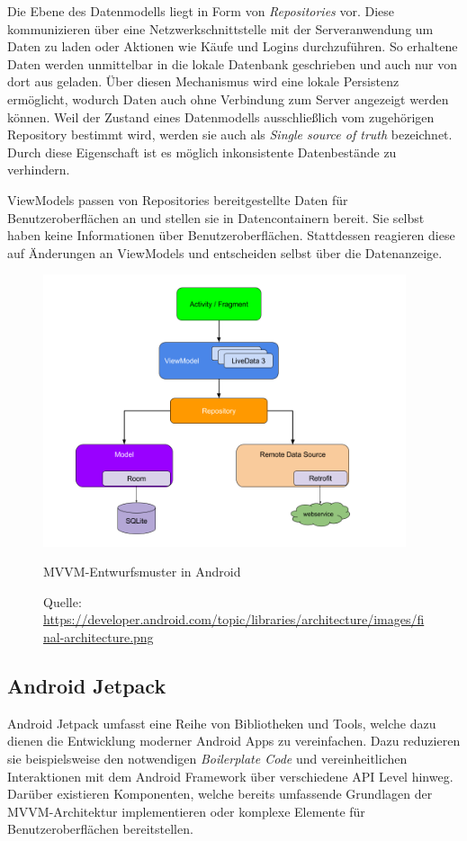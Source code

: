 \documentclass[a4paper, 11pt]{article}
\begin{document}
Die Ebene des Datenmodells liegt in Form von \textit{Repositories} vor.
Diese kommunizieren über eine Netzwerkschnittstelle mit der Serveranwendung um Daten zu laden oder Aktionen wie Käufe und Logins durchzuführen.
So erhaltene Daten werden unmittelbar in die lokale Datenbank geschrieben und auch nur von dort aus geladen.
Über diesen Mechanismus wird eine lokale Persistenz ermöglicht, wodurch Daten auch ohne Verbindung zum Server angezeigt werden können.
Weil der Zustand eines Datenmodells ausschließlich vom zugehörigen Repository bestimmt wird, werden sie auch als \textit{Single source of truth} bezeichnet.
Durch diese Eigenschaft ist es möglich inkonsistente Datenbestände zu verhindern.

ViewModels passen von Repositories bereitgestellte Daten für Benutzeroberflächen an und stellen sie in Datencontainern bereit.
Sie selbst haben keine Informationen über Benutzeroberflächen.
Stattdessen reagieren diese auf Änderungen an ViewModels und entscheiden selbst über die Datenanzeige.

\begin{figure}[]
	\centering
	\includegraphics[height=8cm,keepaspectratio]{./images/android-architecture.png}
	\caption{MVVM-Entwurfsmuster in Android}
	\caption*{\small Quelle: \url{https://developer.android.com/topic/libraries/architecture/images/final-architecture.png}}
	\label{fig:app:architecture:mvvm}
\end{figure}

\subsection{Android Jetpack}
\label{subsec:app:jetpack}
Android Jetpack umfasst eine Reihe von Bibliotheken und Tools, welche dazu dienen die Entwicklung moderner Android Apps zu vereinfachen.
Dazu reduzieren sie beispielsweise den notwendigen \textit{Boilerplate Code} und vereinheitlichen Interaktionen mit dem Android Framework über verschiedene API Level hinweg.
Darüber existieren Komponenten, welche bereits umfassende Grundlagen der MVVM-Architektur implementieren oder komplexe Elemente für Benutzeroberflächen bereitstellen.
\end{document}
